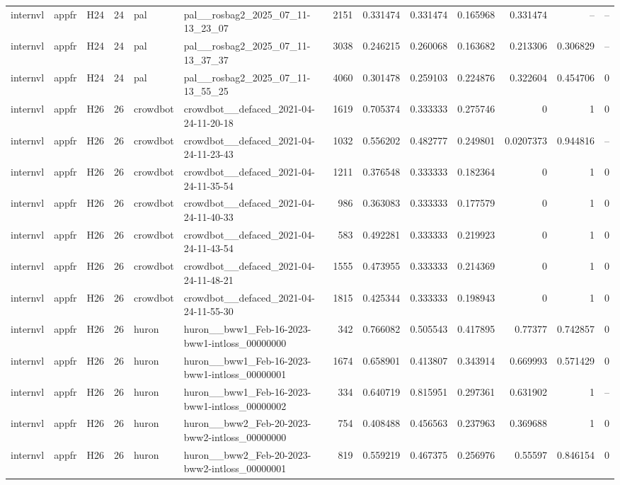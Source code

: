 \begin{longtable}{lllrllrrrrrrr}
internvl & appfr & H24 & 24 & pal & pal\_\_rosbag2\_2025\_07\_11-13\_23\_07 & 2151 & 0.331474 & 0.331474 & 0.165968 & 0.331474 & -- & -- \\
internvl & appfr & H24 & 24 & pal & pal\_\_rosbag2\_2025\_07\_11-13\_37\_37 & 3038 & 0.246215 & 0.260068 & 0.163682 & 0.213306 & 0.306829 & -- \\
internvl & appfr & H24 & 24 & pal & pal\_\_rosbag2\_2025\_07\_11-13\_55\_25 & 4060 & 0.301478 & 0.259103 & 0.224876 & 0.322604 & 0.454706 & 0 \\
internvl & appfr & H26 & 26 & crowdbot & crowdbot\_\_defaced\_2021-04-24-11-20-18 & 1619 & 0.705374 & 0.333333 & 0.275746 & 0 & 1 & 0 \\
internvl & appfr & H26 & 26 & crowdbot & crowdbot\_\_defaced\_2021-04-24-11-23-43 & 1032 & 0.556202 & 0.482777 & 0.249801 & 0.0207373 & 0.944816 & -- \\
internvl & appfr & H26 & 26 & crowdbot & crowdbot\_\_defaced\_2021-04-24-11-35-54 & 1211 & 0.376548 & 0.333333 & 0.182364 & 0 & 1 & 0 \\
internvl & appfr & H26 & 26 & crowdbot & crowdbot\_\_defaced\_2021-04-24-11-40-33 & 986 & 0.363083 & 0.333333 & 0.177579 & 0 & 1 & 0 \\
internvl & appfr & H26 & 26 & crowdbot & crowdbot\_\_defaced\_2021-04-24-11-43-54 & 583 & 0.492281 & 0.333333 & 0.219923 & 0 & 1 & 0 \\
internvl & appfr & H26 & 26 & crowdbot & crowdbot\_\_defaced\_2021-04-24-11-48-21 & 1555 & 0.473955 & 0.333333 & 0.214369 & 0 & 1 & 0 \\
internvl & appfr & H26 & 26 & crowdbot & crowdbot\_\_defaced\_2021-04-24-11-55-30 & 1815 & 0.425344 & 0.333333 & 0.198943 & 0 & 1 & 0 \\
internvl & appfr & H26 & 26 & huron & huron\_\_bww1\_Feb-16-2023-bww1-intloss\_00000000 & 342 & 0.766082 & 0.505543 & 0.417895 & 0.77377 & 0.742857 & 0 \\
internvl & appfr & H26 & 26 & huron & huron\_\_bww1\_Feb-16-2023-bww1-intloss\_00000001 & 1674 & 0.658901 & 0.413807 & 0.343914 & 0.669993 & 0.571429 & 0 \\
internvl & appfr & H26 & 26 & huron & huron\_\_bww1\_Feb-16-2023-bww1-intloss\_00000002 & 334 & 0.640719 & 0.815951 & 0.297361 & 0.631902 & 1 & -- \\
internvl & appfr & H26 & 26 & huron & huron\_\_bww2\_Feb-20-2023-bww2-intloss\_00000000 & 754 & 0.408488 & 0.456563 & 0.237963 & 0.369688 & 1 & 0 \\
internvl & appfr & H26 & 26 & huron & huron\_\_bww2\_Feb-20-2023-bww2-intloss\_00000001 & 819 & 0.559219 & 0.467375 & 0.256976 & 0.55597 & 0.846154 & 0 \\

\end{longtable}
